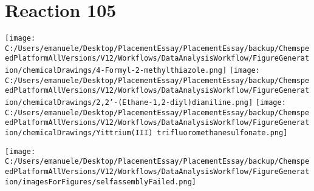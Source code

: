 \documentclass{article}%
\begin{document}
\section*{Reaction 105}%
%
\begin{scheme}[H]%
\begin{minipage}{0.5\textwidth}%
\texttt{[image: C:/Users/emanuele/Desktop/PlacementEssay/PlacementEssay/backup/ChemspeedPlatformAllVersions/V12/Workflows/DataAnalysisWorkflow/FigureGeneration/chemicalDrawings/4-Formyl-2-methylthiazole.png]}%
\texttt{[image: C:/Users/emanuele/Desktop/PlacementEssay/PlacementEssay/backup/ChemspeedPlatformAllVersions/V12/Workflows/DataAnalysisWorkflow/FigureGeneration/chemicalDrawings/2,2'-(Ethane-1,2-diyl)dianiline.png]}%
\texttt{[image: C:/Users/emanuele/Desktop/PlacementEssay/PlacementEssay/backup/ChemspeedPlatformAllVersions/V12/Workflows/DataAnalysisWorkflow/FigureGeneration/chemicalDrawings/Yittrium(III) trifluoromethanesulfonate.png]}%
\end{minipage}%
\begin{minipage}{0.5\textwidth}%
\begin{center}%
\texttt{[image: C:/Users/emanuele/Desktop/PlacementEssay/PlacementEssay/backup/ChemspeedPlatformAllVersions/V12/Workflows/DataAnalysisWorkflow/FigureGeneration/imagesForFigures/selfassemblyFailed.png]}%
\end{center}%
\end{minipage}%
\caption{Self-assembly of components 1, 20, with Yittrium(III) in a 3.0:1.5:1.0 molar ratio in CH$_3$CN at 60\textdegree C for 40h. These are the reagents (starting materials) for reaction 105.}%
\end{scheme}%
\end{document}
